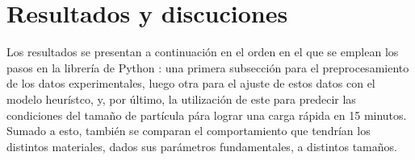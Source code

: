 \section{Resultados y discuciones}

Los resultados se presentan a continuación en el orden en el que se emplean 
los pasos en la librería de Python : una primera subsección
para el preprocesamiento de los datos experimentales, luego otra para el ajuste
de estos datos con el modelo heurístco, y, por último, la utilización de este
para predecir las condiciones del tamaño de partícula pára lograr una carga
rápida en 15 minutos. Sumado a esto, también se comparan el comportamiento que
tendrían los distintos materiales, dados sus parámetros fundamentales, a 
distintos tamaños.




